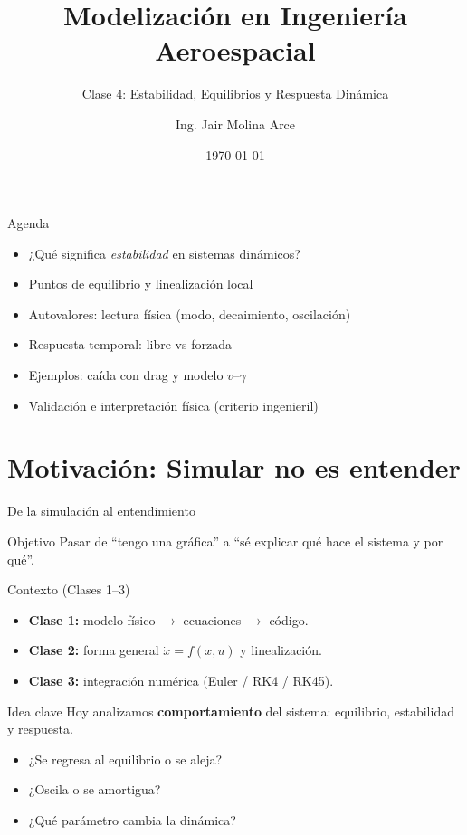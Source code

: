 \documentclass[aspectratio=169,10pt]{beamer}
\title[Modelización Aeroespacial]{Modelización en Ingeniería Aeroespacial}
\subtitle{Clase 4: Estabilidad, Equilibrios y Respuesta Dinámica}
\author[Ing. Jair Molina]{Ing. Jair Molina Arce}
\institute[UNII]{Universidad Internacional de Innovación}
\date{\today}
\newcommand{\importantbox}[2][Importante]{%
\begin{alertblock}{#1}#2\end{alertblock}}
\newcommand{\objectivebox}[1]{%
\begin{block}{Objetivo}#1\end{block}}
\begin{document}
\begin{frame}
\titlepage
\end{frame}

\begin{frame}{Agenda}
\small
\begin{itemize}
\item ¿Qué significa \textit{estabilidad} en sistemas dinámicos?
\item Puntos de equilibrio y linealización local
\item Autovalores: lectura física (modo, decaimiento, oscilación)
\item Respuesta temporal: libre vs forzada
\item Ejemplos: caída con drag y modelo $v$--$\gamma$
\item Validación e interpretación física (criterio ingenieril)
\end{itemize}
\end{frame}

\section{Motivación: Simular no es entender}

\begin{frame}{De la simulación al entendimiento}
\small

\objectivebox{
Pasar de ``tengo una gráfica'' a ``sé explicar qué hace el sistema y por qué''.
}

\vspace{2mm}

\begin{block}{Contexto (Clases 1--3)}
\begin{itemize}
\item \textbf{Clase 1:} modelo físico $\rightarrow$ ecuaciones $\rightarrow$ código.
\item \textbf{Clase 2:} forma general $\dot{x}=f(x,u)$ y linealización.
\item \textbf{Clase 3:} integración numérica (Euler / RK4 / RK45).
\end{itemize}
\end{block}

\importantbox[Idea clave]{
Hoy analizamos \textbf{comportamiento} del sistema: equilibrio, estabilidad y respuesta.
\begin{itemize}
\item ¿Se regresa al equilibrio o se aleja?
\item ¿Oscila o se amortigua?
\item ¿Qué parámetro cambia la dinámica?
\end{itemize}
}

\end{frame}
\end{document}
